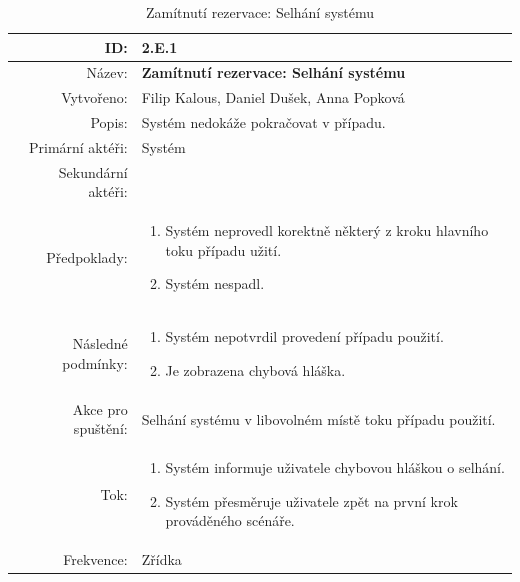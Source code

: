\begin{table}[ht!]
{\renewcommand{\arraystretch}{1.3}
\begin{tabular}{| r | p{12cm} |}
	\hline
	ID: & 2.E.1 \\
    \hline
    Název: & \textbf{Zamítnutí rezervace: Selhání systému} \\
    \hline
    Vytvořeno: & Filip Kalous, Daniel Dušek, Anna Popková \\
    \hline
    Popis: & Systém nedokáže pokračovat v případu. \\
    \hline
    Primární aktéři: & Systém \\
    \hline
    Sekundární aktéři: &  \\
    \hline
    Předpoklady: & 
    \begin{minipage}[t]{0.75\textwidth}
    	\begin{enumerate}[nosep,after=\strut]
    		\item Systém neprovedl korektně některý z kroku hlavního toku případu užití.
            \item Systém nespadl.
    	\end{enumerate}
  	\end{minipage} \\
    \hline
    Následné podmínky: & 
    \begin{minipage}[t]{0.75\textwidth}
    	\begin{enumerate}[nosep,after=\strut]
    		\item Systém nepotvrdil provedení případu použití.
            \item Je zobrazena chybová hláška.
    	\end{enumerate}
  	\end{minipage} \\
	\hline
    Akce pro spuštění: & Selhání systému v libovolném místě toku případu použití. \\
    \hline
    Tok: & 
    \begin{minipage}[t]{0.75\textwidth}
    	\begin{enumerate}[nosep,after=\strut]
            \item Systém informuje uživatele chybovou hláškou o selhání.
            \item Systém přesměruje uživatele zpět na první krok prováděného scénáře.
    	\end{enumerate}
  	\end{minipage} \\
    \hline
    Frekvence: & Zřídka \\
    \hline

\end{tabular}}
\caption{Zamítnutí rezervace: Selhání systému}
\label{table:6}
\end{table}


